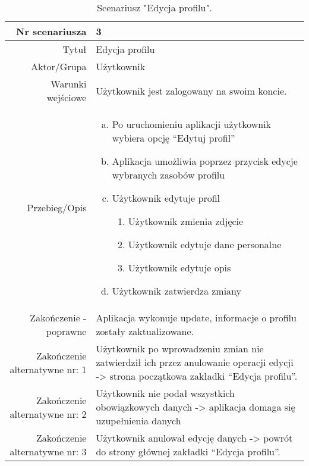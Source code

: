 \documentclass[12pt,a4paper]{article}
\begin{document}
\begin{table} [H]
\centering
\begin{tabular}{|r|p{9cm}|} \hline
Nr scenariusza & 3 \\
\hline
Tytuł & Edycja profilu  \\
\hline
Aktor/Grupa & Użytkownik \\
\hline
Warunki wejściowe & Użytkownik jest zalogowany na swoim koncie. \\
\hline
Przebieg/Opis & 
\begin{enumerate}[a)]
\item Po uruchomieniu aplikacji użytkownik wybiera opcję “Edytuj profil”
\item Aplikacja umożliwia poprzez przycisk edycje wybranych zasobów profilu
\item Użytkownik edytuje profil 
\begin{enumerate}
    \item Użytkownik zmienia zdjęcie
    \item Użytkownik edytuje dane personalne  
    \item Użytkownik edytuje opis 
  \end{enumerate}
\item Użytkownik zatwierdza zmiany 
\end{enumerate}
\\
\hline
Zakończenie - poprawne & Aplikacja wykonuje update, informacje o profilu zostały zaktualizowane.  
\\ 
\hline
Zakończenie alternatywne nr: 1 & Użytkownik po wprowadzeniu zmian nie zatwierdził ich przez anulowanie operacji edycji  -> strona początkowa zakładki “Edycja profilu”.
\\
\hline
Zakończenie alternatywne nr: 2 & Użytkownik nie podał wszystkich obowiązkowych danych -> aplikacja domaga się uzupełnienia danych
\\
\hline
Zakończenie alternatywne nr: 3 & Użytkownik anulował edycję danych  -> powrót do strony głównej zakładki “Edycja profilu”. 
\\
\hline
\end{tabular}
\caption{Scenariusz "Edycja profilu".}
\label{table:3}
\end{table}
\end{document}
